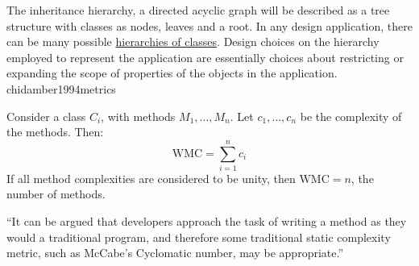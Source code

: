 \documentclass{article}
\begin{document}

  {The inheritance hierarchy, a directed acyclic graph will be described as a tree structure with classes as nodes, leaves and a root. In any design application, there can be many possible \ul{hierarchies of classes}. Design choices on the hierarchy employed to represent the application are essentially choices about restricting or expanding the scope of properties of the objects in the application.}
  {chidamber1994metrics}

\begin{multicols}{2}
Consider a class \(C_i\), with methods \(M_1, \dots, M_n\). Let \(c_1, \dots, c_n\) be
the complexity of the methods. Then:
\begin{equation*}
\text{WMC} = \sum_{i=1}^{n} c_i
\end{equation*}
If all method complexities are considered to be unity, then \(\text{WMC} = n\),
the number of methods.
\par\columnbreak\par
``It can be argued that developers approach the task of writing a method as they would
a traditional program, and therefore some traditional static complexity metric,
such as McCabe's Cyclomatic number, may be appropriate.''
\end{multicols}
\plush{}
\end{document}
